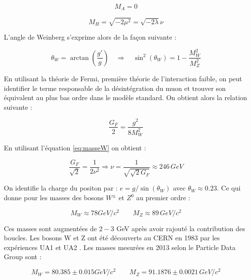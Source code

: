  \begin{equation}
   M_A = 0
  \end{equation}

  \begin{equation}
   M_H = \sqrt{-2\mu^2} = \sqrt{-2\lambda} \nu 
  \end{equation}

  L'angle de Weinberg s'exprime alors de la fa\c{c}on suivante : 
  
  \begin{equation}
   \theta_W = \arctan \left( \dfrac{g'}{g} \right) \quad \Rightarrow \quad \sin^2(\theta_W) = 1 - \dfrac{M_W^2}{M_Z^2}
  \end{equation}

  En utilisant la th\'eorie de Fermi, premi\`ere th\'eorie de l'interaction faible, on peut identifier le terme responsable de la d\'esint\'egration du muon et trouver son \'equivalent au plus bas ordre dans le mod\`ele standard. On obtient alors la relation suivante : 

  \begin{equation}
   \dfrac{G_F}{2} = \dfrac{g^2}{8 M_W^2}
  \end{equation}

  En utilisant l'équation \ref{eq:masseW} on obtient :
  
  \begin{equation}
   \dfrac{G_F}{\sqrt{2}} = \dfrac{1}{2 \nu^2} \Rightarrow \nu = \dfrac{1}{\sqrt{\sqrt{2} G_F}} \approx 246 \, GeV
  \end{equation}

  On identifie la charge du positon par : $e=g/\sin(\theta_W)$ avec $\theta_W \approx 0.23$. Ce qui donne pour les masses des bosons $W^\pm$ et $Z^0$ au premier ordre :
  
  \begin{equation}
   M_W \approx 78 GeV/c^2 \qquad M_Z \approx 89 \, GeV/c^2
  \end{equation}

  Ces masses sont augment\'ees de $2-3$ GeV apr\`es avoir rajout\'e la contribution des boucles. Les bosons W et Z ont \'et\'e d\'ecouverts au CERN en 1983 par les exp\'eriences UA1 \cite{Arnison:1985jk} et UA2 \cite{Ansari:1987vg}.
  Les masses mesur\'ees en 2013 selon le Particle Data Group sont :
  
  \begin{equation}
   M_W = 80.385 \pm 0.015 GeV/c^2 \qquad M_Z = 91.1876 \pm 0.0021 \, GeV/c^2
  \end{equation}

